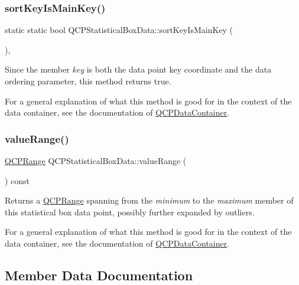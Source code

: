 \subsubsection{\texorpdfstring{sort\+Key\+Is\+Main\+Key()}{sortKeyIsMainKey()}}
{\footnotesize\ttfamily static static bool Q\+C\+P\+Statistical\+Box\+Data\+::sort\+Key\+Is\+Main\+Key (\begin{DoxyParamCaption}{ }\end{DoxyParamCaption})\hspace{0.3cm}{\ttfamily [inline]}, {\ttfamily [static]}}

Since the member {\itshape key} is both the data point key coordinate and the data ordering parameter, this method returns true.

For a general explanation of what this method is good for in the context of the data container, see the documentation of \hyperlink{class_q_c_p_data_container}{Q\+C\+P\+Data\+Container}. \mbox{\label{class_q_c_p_statistical_box_data_a1a2410fcf3d45fa3a1ad09e265b9bcad}} 
\subsubsection{\texorpdfstring{value\+Range()}{valueRange()}}
{\footnotesize\ttfamily \hyperlink{class_q_c_p_range}{Q\+C\+P\+Range} Q\+C\+P\+Statistical\+Box\+Data\+::value\+Range (\begin{DoxyParamCaption}{ }\end{DoxyParamCaption}) const\hspace{0.3cm}{\ttfamily [inline]}}

Returns a \hyperlink{class_q_c_p_range}{Q\+C\+P\+Range} spanning from the {\itshape minimum} to the {\itshape maximum} member of this statistical box data point, possibly further expanded by outliers.

For a general explanation of what this method is good for in the context of the data container, see the documentation of \hyperlink{class_q_c_p_data_container}{Q\+C\+P\+Data\+Container}. 

\subsection{Member Data Documentation}
\mbox{\label{class_q_c_p_statistical_box_data_a2d0b5ca5130e8a73294c46b8b2fd77b8}} 
